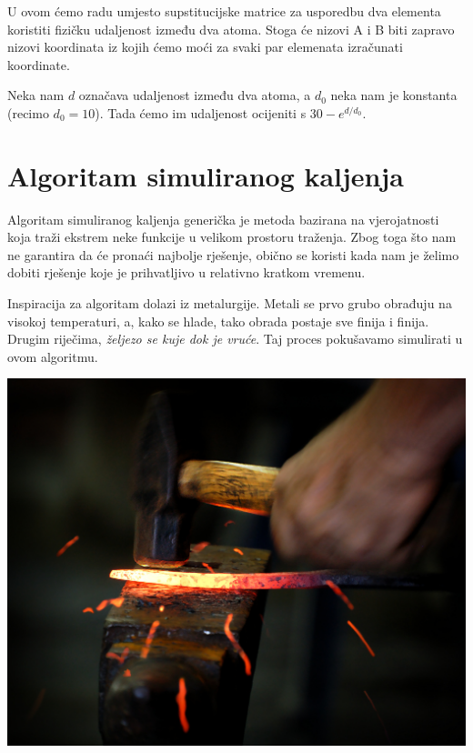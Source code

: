 \documentclass[times, utf8, zavrsni]{fer}
\begin{document}
U ovom ćemo radu umjesto supstitucijske matrice za usporedbu dva elementa
koristiti fizičku udaljenost između dva atoma. Stoga će nizovi A i B biti
zapravo nizovi koordinata iz kojih ćemo moći za svaki par elemenata
izračunati koordinate. 

Neka nam $d$ označava udaljenost između dva atoma, a $d_0$ neka nam
je konstanta (recimo $d_0 = 10$). Tada ćemo im udaljenost ocijeniti s
$30-e^{d/d_0}$. 


\chapter{Algoritam simuliranog kaljenja}
Algoritam simuliranog kaljenja generička je metoda bazirana na vjerojatnosti koja
traži ekstrem neke funkcije u velikom prostoru traženja. Zbog toga što nam ne
garantira da će pronaći najbolje rješenje, obično se koristi kada nam je
želimo dobiti rješenje koje je prihvatljivo u relativno kratkom
vremenu.

Inspiracija za algoritam dolazi iz metalurgije. Metali se prvo grubo obrađuju
na visokoj temperaturi, a, kako se hlade, tako obrada postaje sve finija
i  finija. Drugim riječima, \textit{željezo se kuje dok je vruće}. 
Taj proces pokušavamo simulirati u ovom algoritmu.

\includegraphics{res/Kovanje_zeljeza_l.jpg}
\end{document}
